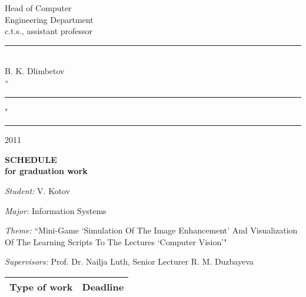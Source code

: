 \begin{titlepage}
\begin{centering}
\begin{flushright}
			Head of Computer\\
			Engineering Department\\
			c.t.s., assistant professor\\
			\vspace{0.5\baselineskip}
			\rule{13em}{0.4pt}\\
			B. K. Dlimbetov\\
			\vspace{0.5\baselineskip}
			``\rule{2em}{0.4pt}" \rule{8em}{0.4pt} 2011\\
		\end{flushright}

		{\bf
		\MakeUppercase{Schedule}\\
		for graduation work}

		\vspace{12pt}
	\end{centering}

	\emph{Student:} V. Kotov

	\emph{Major:} Information Systems

	\emph{Theme:} ``Mini-Game `Simulation Of The Image Enhancement' And Visualization Of The Learning Scripts To The Lectures `Computer Vision'"

	\emph{Supervisors:} Prof. Dr. Nailja Luth, Senior Lecturer R. M. Duzbayeva

	\begin{centering}

		\begin{longtable}{|p{}|l|}
			\hline
			\textbf{Type of work} & \textbf{Deadline}\\
			\endhead

			\hline


\end{longtable}
\end{centering}
\end{titlepage}
